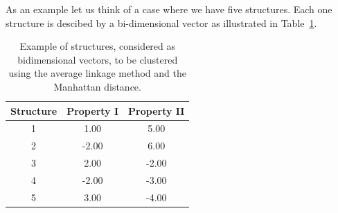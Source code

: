 



As  an   example  let  us  think   of  a  case  where   we  have  five
structures. Each one structure  is descibed by a bi-dimensional vector
as illustrated in Table~\ref{tab:data}.
\begin{table}
\centering
\begin{tabular}[h]{|c|c|c|}
\hline
Structure & Property I & Property II\\
\hline\hline
1  &     1.00  &  5.00 \\
\hline
2  &    -2.00  & 6.00 \\
\hline
3  &      2.00  & -2.00 \\
\hline
4  &     -2.00  & -3.00 \\
\hline
5  &     3.00  &  -4.00 \\
\hline
\end{tabular}
\caption{Example of  structures, considered as  bidimensional vectors,
  to be clustered  using the average linkage method  and the Manhattan
  distance.}
\label{tab:data}
\end{table}

